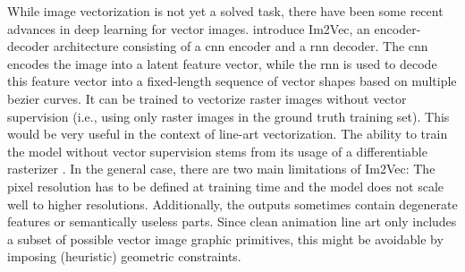 While image vectorization is not yet a solved task, there have been some recent advances in deep learning for vector images. \citet{DBLP:conf/cvpr/Reddy21} introduce Im2Vec, an encoder-decoder architecture consisting of a \gls{cnn} encoder and a \gls{rnn} decoder. The \gls{cnn} encodes the image into a latent feature vector, while the \gls{rnn} is used to decode this feature vector into a fixed-length sequence of vector shapes based on multiple bezier curves. It can be trained to vectorize raster images without vector supervision (i.e., using only raster images in the ground truth training set). This would be very useful in the context of line-art vectorization. The ability to train the model without vector supervision stems from its usage of a differentiable rasterizer \citep{Li:2020:DVG}. In the general case, there are two main limitations of Im2Vec: The pixel resolution has to be defined at training time and the model does not scale well to higher resolutions. Additionally, the outputs sometimes contain degenerate features or semantically useless parts. Since clean animation line art only includes a subset of possible vector image graphic primitives, this might be avoidable by imposing (heuristic) geometric constraints.

